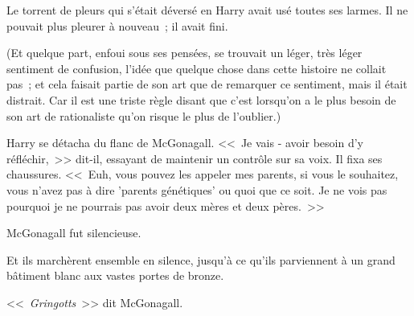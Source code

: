 Le torrent de pleurs qui s'était déversé en Harry avait usé toutes ses larmes. Il ne pouvait plus pleurer à nouveau~; il avait fini.

(Et quelque part, enfoui sous ses pensées, se trouvait un léger, très léger sentiment de confusion, l'idée que quelque chose dans cette histoire ne collait pas~; et cela faisait partie de son art que de remarquer ce sentiment, mais il était distrait. Car il est une triste règle disant que c'est lorsqu'on a le plus besoin de son art de rationaliste qu'on risque le plus de l'oublier.)

Harry se détacha du flanc de McGonagall. <<~Je vais - avoir besoin d'y réfléchir,~>> dit-il, essayant de maintenir un contrôle sur sa voix. Il fixa ses chaussures. <<~Euh, vous pouvez les appeler mes parents, si vous le souhaitez, vous n'avez pas à dire 'parents génétiques' ou quoi que ce soit. Je ne vois pas pourquoi je ne pourrais pas avoir deux mères et deux pères.~>>

McGonagall fut silencieuse.

Et ils marchèrent ensemble en silence, jusqu'à ce qu'ils parviennent à un grand bâtiment blanc aux vastes portes de bronze.

<<~\emph{Gringotts}~>> dit McGonagall. 

